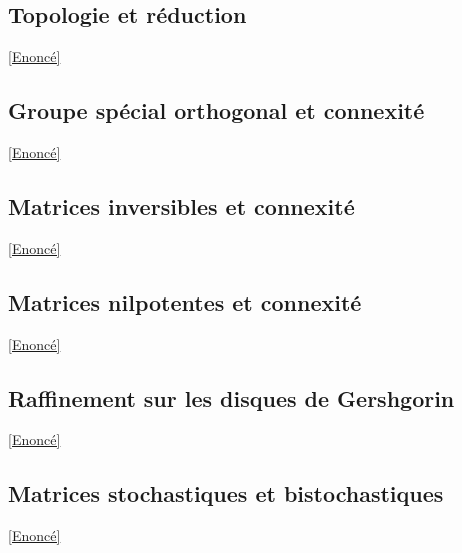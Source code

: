\documentclass{book}
\begin{document}
	\subsection{Topologie et réduction}
	\label{sec:topologie-et-reduction}
	\textcolor{blue}{\hyperref[Topologie et réduction]{[Enoncé]}}\\
	
	\subsection{Groupe spécial orthogonal et connexité}
	\label{sec:groupe-special-orthogonal-et-connexite}
	\textcolor{blue}{\hyperref[Groupe spécial orthogonal et connexité]{[Enoncé]}}\\
	
	\subsection{Matrices inversibles et connexité}
	\label{sec:matrices-inversibles-et-connexite}
	\textcolor{blue}{\hyperref[Matrices inversibles et connexité]{[Enoncé]}}\\
	
	\subsection{Matrices nilpotentes et connexité}
	\label{sec:matrices-nilpotentes-et-connexite}
	\textcolor{blue}{\hyperref[Matrices nilpotentes et connexité]{[Enoncé]}}\\
	
	\subsection{Raffinement sur les disques de Gershgorin}
	\label{sec:raffinement-sur-les-disques-de-gershgorin}
	\textcolor{blue}{\hyperref[Raffinament sur les disques de Gershgorin]{[Enoncé]}}\\
	
	\subsection{Matrices stochastiques et bistochastiques}
	\label{sec:matrices-stochastiques-et-bistochastiques}
	\textcolor{blue}{\hyperref[Matrices stochastiques et bistochatiques]{[Enoncé]}}\\
	
\end{document}
